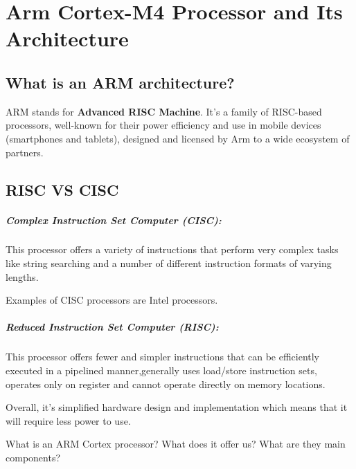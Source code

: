 \chapter{Arm Cortex-M4 Processor and Its
Architecture}

\section{What is an ARM architecture?}

ARM stands for \textbf{Advanced RISC Machine}. It's a family of RISC-based processors, well-known for their
power efficiency and use in mobile devices (smartphones and tablets), designed and licensed by Arm to a
wide ecosystem of partners.

\section{RISC VS CISC}


\paragraph{Complex Instruction Set Computer (CISC):}
\paragraph{}
This processor offers a variety of instructions that perform very complex tasks like string searching and a
number of different instruction formats of varying lengths.

Examples of CISC processors are Intel processors.

\paragraph{Reduced Instruction Set Computer (RISC):}
\paragraph{}

This processor offers fewer and simpler instructions that can be efficiently executed in a pipelined manner,generally uses load/store instruction sets, operates only on register and cannot operate directly on
memory locations.


Overall, it's simplified hardware design and implementation which means that it will require less
power to use.


What is an ARM Cortex processor? What does it offer us? What are they main components?


